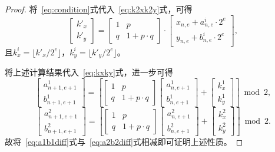 \begin{proof}
将~\eqref{eq:condition}式代入~\eqref{eq:k2xk2y}式，可得
\begin{equation}
	\begin{bmatrix}
		k'_x \\
		k'_y
	\end{bmatrix}
	=
	\begin{bmatrix}
		1 & p    \\
		q & 1+p\cdot q
	\end{bmatrix}\cdot
	\begin{bmatrix}
	x_{n,e}+a^i_{n,e}\cdot 2^e\\
    y_{n,e}+b^i_{n,e}\cdot 2^e
	\end{bmatrix},
\end{equation}
且$k^i_x=\lfloor k'_x/2^e\rfloor$，$k^i_y=\lfloor k'_y/2^e\rfloor$。

将上述计算结果代入~\eqref{eq:kxky}式，进一步可得
\begin{equation}
    \begin{bmatrix}
		a^1_{n+1, e+1}\\
		b^1_{n+1, e+1}
	\end{bmatrix}
     =
	\left[\begin{bmatrix}
		1 & p    \\
		q & 1+p\cdot q
	\end{bmatrix}
	\begin{bmatrix}
		a^1_{n, e+1}\\
		b^1_{n, e+1}
	\end{bmatrix}+
    \begin{bmatrix}
		k^1_x\\
		k^1_y
	\end{bmatrix}\right]
	\bmod 2,
	\label{eq:a1b1diff}
\end{equation}
\begin{equation}
    \begin{bmatrix}
		a^2_{n+1, e+1}\\
		b^2_{n+1, e+1}
	\end{bmatrix}
     =
	\left[\begin{bmatrix}
		1 & p    \\
		q & 1+p\cdot q
	\end{bmatrix}
	\begin{bmatrix}
		a^2_{n, e+1}\\
		b^2_{n, e+1}
	\end{bmatrix}+
    \begin{bmatrix}
		k^2_x\\
		k^2_y
	\end{bmatrix}\right]
	\bmod 2.
	\label{eq:a2b2diff}
\end{equation}
故将~\eqref{eq:a1b1diff}式与~\eqref{eq:a2b2diff}式相减即可证明上述性质。\qedsymbol
\end{proof}

